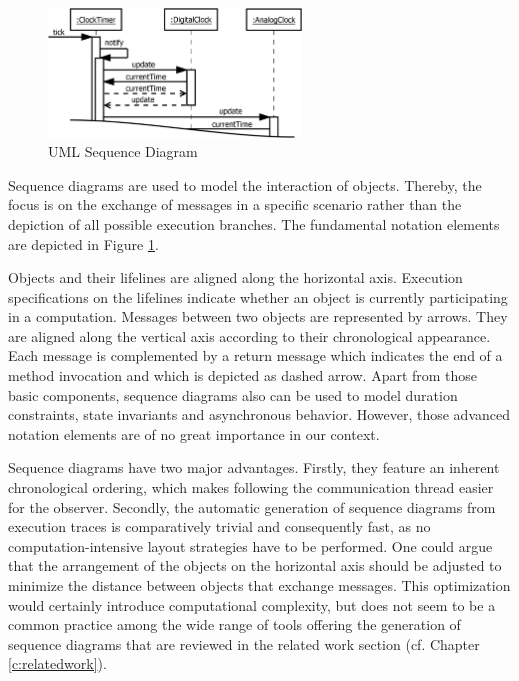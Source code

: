 \begin{figure}
	\centering
	\includegraphics[width=0.6\textwidth]{../images/02-Sequence}
	\caption[TOC Caption]{UML Sequence Diagram}
	\label{fig:BackgroundModelingSequence}
\end{figure}

Sequence diagrams \cite{rumbaugh_unified_2010} are used to model the interaction of objects.
Thereby, the focus is on the exchange of messages in a specific scenario rather than the depiction of all possible execution branches.
The fundamental notation elements are depicted in Figure \ref{fig:BackgroundModelingSequence}.

Objects and their lifelines are aligned along the horizontal axis.
Execution specifications on the lifelines indicate whether an object is currently participating in a computation.
Messages between two objects are represented by arrows.
They are aligned along the vertical axis according to their chronological appearance.
Each message is complemented by a return message which indicates the end of a method invocation and which is depicted as dashed arrow.
Apart from those basic components, sequence diagrams also can be used to model duration constraints, state invariants and asynchronous behavior.
However, those advanced notation elements are of no great importance in our context.

Sequence diagrams have two major advantages.
Firstly, they feature an inherent chronological ordering, which makes following the communication thread easier for the observer.
Secondly, the automatic generation of sequence diagrams from execution traces is comparatively trivial and consequently fast, as no computation-intensive layout strategies have to be performed.
One could argue that the arrangement of the objects on the horizontal axis should be adjusted to minimize the distance between objects that exchange messages.
This optimization would certainly introduce computational complexity, but does not seem to be a common practice among the wide range of tools offering the generation of sequence diagrams that are reviewed in the related work section (cf. Chapter \ref{c:relatedwork}).

